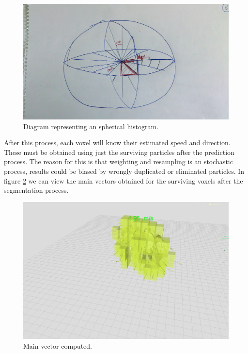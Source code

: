 \begin{figure}[t]
  \centering
  \includegraphics{sphericalHist}
  \caption{Diagram representing an spherical histogram.}\label{fig:cp05_spherical_hist}
\end{figure}

 After this process, each voxel will know their estimated speed and direction. These must be obtained using just the surviving particles after the prediction process. The reason for this is that weighting and resampling is an stochastic process, results could be biased by wrongly duplicated or eliminated particles. In figure \ref{fig:cp05_main_vectors_per_voxel} we can view the main vectors obtained for the surviving voxels after the segmentation process.

 \FloatBarrier
 
\begin{figure}[t]
  \centering
  \includegraphics{obstacleSpeed}
  \caption{Main vector computed.}\label{fig:cp05_main_vectors_per_voxel}
\end{figure}

